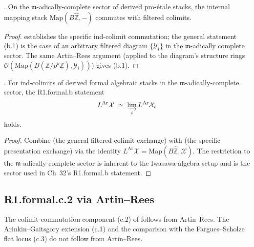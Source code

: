 \begin{corollary}
\label{v4-arith:w5-i:cor:b1-closure}
\ClaimStatusProvedHere. On the \(\mathfrak{m}\)-adically-complete
sector of derived pro-\'etale stacks, the internal mapping stack
\(\mathrm{Map}(B\widehat{\mathbb{Z}},-)\) commutes with filtered
colimits.
\end{corollary}

\begin{proof}
 establishes the specific
ind-colimit commutation; the general statement (b.1) is the case
of an arbitrary filtered diagram \(\{\mathcal{Y}_{i}\}\) in the
\(\mathfrak{m}\)-adically complete sector. The same Artin--Rees
argument (applied to the diagram's structure rings
\(\mathcal{O}(\mathrm{Map}(B(\mathbb{Z}/p^{k}\mathbb{Z}),\mathcal{Y}_{i}))\))
gives (b.1).
\end{proof}

\begin{theorem}
\label{v4-arith:w5-i:thm:R1-formal-b-closes}
\ClaimStatusProvedHere. For ind-colimits of derived formal algebraic
stacks in the \(\mathfrak{m}\)-adically-complete sector, the R1.formal.b
statement
\[
L^{\mathrm{Ar}}\mathcal{X}\;\simeq\;\varinjlim_{i}L^{\mathrm{Ar}}\mathcal{X}_{i}
\]
holds.
\end{theorem}

\begin{proof}
Combine  (the general
filtered-colimit exchange) with
 (the specific presentation
exchange) via the identity
\(L^{\mathrm{Ar}}\mathcal{X}=\mathrm{Map}(B\widehat{\mathbb{Z}},\mathcal{X})\).
The restriction to the \(\mathfrak{m}\)-adically-complete sector is
inherent to the Iwasawa-algebra setup and is the sector used in
Ch~32's R1.formal.b statement.
\end{proof}

\subsection{R1.formal.c.2 via Artin--Rees}
\label{v4-arith:w5-i:R1-formal-c-closure}

The colimit-commutation component (c.2) of
 follows from
Artin--Rees. The Arinkin--Gaitsgory extension (c.1) and the comparison
with the Fargues--Scholze flat locus (c.3) do not follow from
Artin--Rees.

